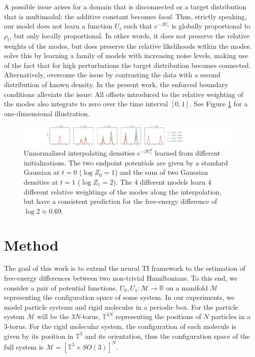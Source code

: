 \documentclass[%
onecolumn,
superscriptaddress,
nofootinbib,
amsmath,amssymb,
table
]{revtex4-2}
\begin{document}
A possible issue arises for a  domain that is disconnected or a target distribution that is multimodal: the additive constant becomes \emph{local}. Thus, strictly speaking, our model does not learn a function $U_t$ such that $e^{-\beta U_t}$ is globally proportional to $\rho_t$, but only locally proportional. In other words, it does not preserve the relative weights of the modes, but does preserve the relative likelihoods within the modes. \citet{song2019generative} solve this by learning a family of models with increasing noise levels, making use of the fact that for high perturbations the target distribution becomes connected. Alternatively, \citet{gutmann2010noise} overcome the issue by contrasting the data with a second distribution of known density. In the present work, the enforced boundary conditions alleviate the issue: All offsets introduced to the relative weighting of the modes also integrate to zero over the time interval $[0,1]$. See Figure \ref{fig:toy_example} for a one-dimensional illustration. 

\begin{figure}[h]
    \begin{center}
    \centerline{\includegraphics[width=\textwidth,trim={7cm 0cm 15cm 0cm},clip]{figures/1d_example.pdf}}
    \caption{Unnormalized interpolating densities $e^{-\beta 
U_t^\theta}$ learned from different initializations. The two endpoint potentials are given by a standard Gaussian at $t=0$ ($\log Z_0 =1$)  and the sum of two Gaussian densities at $t=1$ ($\log Z_1 =2$). The 4 different models learn 4 different relative weightings of the modes along the interpolation, but have a consistent prediction for the free-energy difference of $\log 2 \approx 0.69$.}
    \label{fig:toy_example}
    \end{center}
    \vskip -0.5in
\end{figure}
\section{Method}
\label{sec:method}
The goal of this work is to extend the neural TI framework to the estimation of free-energy differences between two non-trivial Hamiltonians. 
To this end, we consider a pair of potential functions, $U_0, U_1:\mathcal M \rightarrow \mathbb R$ on a manifold $\mathcal M$ representing the configuration space of some system. In our experiments, we model particle systems and rigid molecules in a periodic box. For the particle system $\mathcal M$ will be the $3N$-torus, $\mathbb T^{3N}$ representing the positions of $N$ particles in a 3-torus. For the rigid molecular system, the configuration of each molecule is given by its position in $\mathbb T^{3}$ and its orientation, thus the configuration space of the full system is $\mathcal M = [\mathbb T^{3}\times SO(3)]^N$. 
\end{document}
